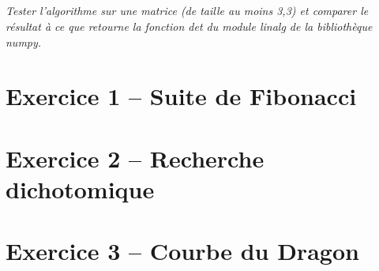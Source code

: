 \documentclass[10pt,fleqn]{article} %
\begin{document}
\begin{multicols}{2}
\subparagraph{}
\textit{Tester l’algorithme sur une matrice (de taille au moins 3,3) et comparer le résultat à ce
que retourne la fonction \textsl{det} du module \textsl{linalg} de la bibliothèque \textsl{numpy}.}

\section*{Exercice 1 -- Suite de Fibonacci}

\section*{Exercice 2 -- Recherche dichotomique}
\section*{Exercice 3 -- Courbe du Dragon}



\end{multicols}

\end{document}
